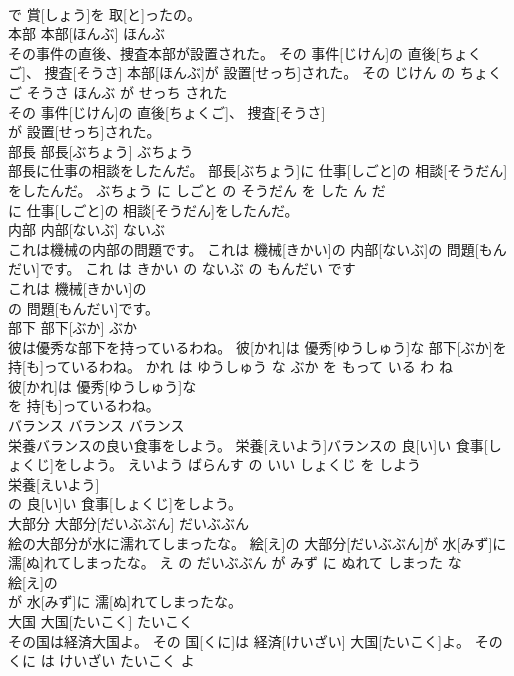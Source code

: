 \documentclass[8pt]{extreport}
\begin{document}
\begin{CJK}{UTF8}{min}
\\	で 賞[しょう]を 取[と]ったの。			
\\	本部	本部[ほんぶ]	ほんぶ	
\\	その事件の直後、捜査本部が設置された。	その 事件[じけん]の 直後[ちょくご]、 捜査[そうさ] 本部[ほんぶ]が 設置[せっち]された。	その じけん の ちょくご そうさ ほんぶ が せっち された	
\\	その 事件[じけん]の 直後[ちょくご]、 捜査[そうさ]
\\	が 設置[せっち]された。			
\\	部長	部長[ぶちょう]	ぶちょう	
\\	部長に仕事の相談をしたんだ。	部長[ぶちょう]に 仕事[しごと]の 相談[そうだん]をしたんだ。	ぶちょう に しごと の そうだん を した ん だ	
\\	に 仕事[しごと]の 相談[そうだん]をしたんだ。			
\\	内部	内部[ないぶ]	ないぶ	
\\	これは機械の内部の問題です。	これは 機械[きかい]の 内部[ないぶ]の 問題[もんだい]です。	これ は きかい の ないぶ の もんだい です	
\\	これは 機械[きかい]の
\\	の 問題[もんだい]です。			
\\	部下	部下[ぶか]	ぶか	
\\	彼は優秀な部下を持っているわね。	彼[かれ]は 優秀[ゆうしゅう]な 部下[ぶか]を 持[も]っているわね。	かれ は ゆうしゅう な ぶか を もって いる わ ね	
\\	彼[かれ]は 優秀[ゆうしゅう]な
\\	を 持[も]っているわね。			
\\	バランス	バランス	バランス	
\\	栄養バランスの良い食事をしよう。	栄養[えいよう]バランスの 良[い]い 食事[しょくじ]をしよう。	えいよう ばらんす の いい しょくじ を しよう	
\\	栄養[えいよう]
\\	の 良[い]い 食事[しょくじ]をしよう。			
\\	大部分	大部分[だいぶぶん]	だいぶぶん	
\\	絵の大部分が水に濡れてしまったな。	絵[え]の 大部分[だいぶぶん]が 水[みず]に 濡[ぬ]れてしまったな。	え の だいぶぶん が みず に ぬれて しまった な	
\\	絵[え]の
\\	が 水[みず]に 濡[ぬ]れてしまったな。			
\\	大国	大国[たいこく]	たいこく	
\\	その国は経済大国よ。	その 国[くに]は 経済[けいざい] 大国[たいこく]よ。	その くに は けいざい たいこく よ	

\end{CJK}
\end{document}
